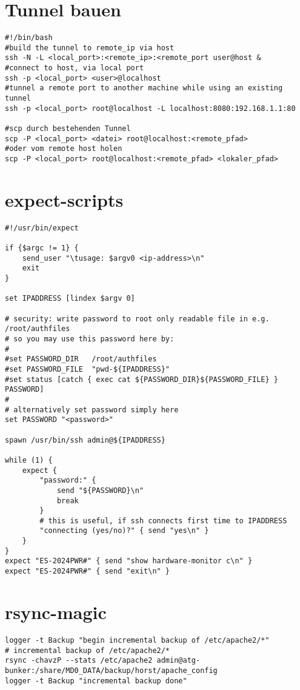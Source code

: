 \documentclass[a4paper,10pt]{report}
\begin{document}
\section{Tunnel bauen}
\begin{verbatim}
#!/bin/bash
#build the tunnel to remote_ip via host
ssh -N -L <local_port>:<remote_ip>:<remote_port user@host &
#connect to host, via local port
ssh -p <local_port> <user>@localhost
#tunnel a remote port to another machine while using an existing tunnel
ssh -p <local_port> root@localhost -L localhost:8080:192.168.1.1:80

#scp durch bestehenden Tunnel
scp -P <local_port> <datei> root@localhost:<remote_pfad>
#oder vom remote host holen
scp -P <local_port> root@localhost:<remote_pfad> <lokaler_pfad>

\end{verbatim}

\section{expect-scripts}
\begin{verbatim}
#!/usr/bin/expect

if {$argc != 1} {
    send_user "\tusage: $argv0 <ip-address>\n"
    exit
}

set IPADDRESS [lindex $argv 0]

# security: write password to root only readable file in e.g. /root/authfiles
# so you may use this password here by:
#
#set PASSWORD_DIR   /root/authfiles
#set PASSWORD_FILE  "pwd-${IPADDRESS}"
#set status [catch { exec cat ${PASSWORD_DIR}${PASSWORD_FILE} } PASSWORD]
#
# alternatively set password simply here
set PASSWORD "<password>"

spawn /usr/bin/ssh admin@${IPADDRESS}

while (1) {
    expect {
        "password:" {			
            send "${PASSWORD}\n"
            break
        }
        # this is useful, if ssh connects first time to IPADDRESS
        "connecting (yes/no)?" { send "yes\n" }
    }
}
expect "ES-2024PWR#" { send "show hardware-monitor c\n" }
expect "ES-2024PWR#" { send "exit\n" }

\end{verbatim}

\section{rsync-magic}
\begin{verbatim}
logger -t Backup "begin incremental backup of /etc/apache2/*"
# incremental backup of /etc/apache2/*
rsync -chavzP --stats /etc/apache2 admin@atg-bunker:/share/MD0_DATA/backup/horst/apache_config
logger -t Backup "incremental backup done"
\end{verbatim}
\end{document}
